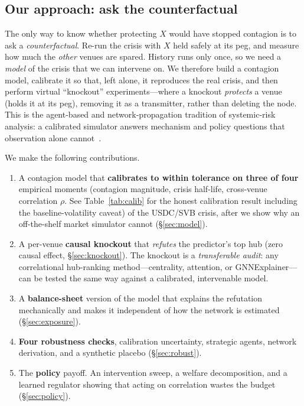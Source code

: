 \documentclass[sigconf,anonymous]{acmart}
\begin{document}
\subsection{Our approach: ask the counterfactual}
The only way to know whether protecting $X$ would have stopped contagion is to ask a
\emph{counterfactual}. Re-run the crisis with $X$ held safely at its peg, and measure how much the
\emph{other} venues are spared. History runs only once, so we need
a \emph{model} of the crisis that we can intervene on. We therefore build a contagion model,
calibrate it so that, left alone, it reproduces the real crisis, and then perform virtual
``knockout'' experiments---where a knockout \emph{protects} a venue (holds it at its peg),
removing it as a transmitter, rather than deleting the node. This is the agent-based and network-propagation tradition of systemic-risk
analysis: a calibrated simulator answers mechanism and policy questions that
observation alone cannot~\cite{gu2024spoofability,battiston2012debtrank}.

We make the following contributions.
\begin{enumerate}
\item A contagion model that \textbf{calibrates to within tolerance on three of four} empirical moments (contagion magnitude, crisis half-life, cross-venue correlation $\rho$. See Table~\ref{tab:calib} for the honest calibration result including the baseline-volatility caveat)
of the USDC/SVB crisis, after we show why an off-the-shelf market simulator cannot (\S\ref{sec:model}).
\item A per-venue \textbf{causal knockout} that \emph{refutes} the predictor's top hub (zero causal
effect, \S\ref{sec:knockout}). The knockout is a \emph{transferable audit}: any correlational
hub-ranking method---centrality, attention, or GNNExplainer---can be tested the same way against a
calibrated, intervenable model.
\item A \textbf{balance-sheet} version of the model that explains the refutation mechanically and
makes it independent of how the network is estimated (\S\ref{sec:exposure}).
\item \textbf{Four robustness checks}, calibration uncertainty, strategic agents, network
derivation, and a synthetic placebo (\S\ref{sec:robust}).
\item The \textbf{policy} payoff. An intervention sweep, a welfare decomposition, and a learned
regulator showing that acting on correlation wastes the budget (\S\ref{sec:policy}).
\end{enumerate}
\end{document}
